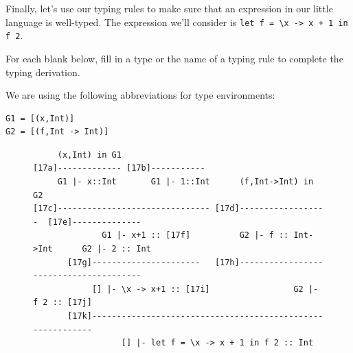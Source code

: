\documentclass[addpoints]{exam}
\begin{document}
\begin{questions}

\newpage

\question

Finally, let's use our typing rules to make sure that an expression in our little language is well-typed.  The expression we'll consider is \verb|let f = \x -> x + 1 in f 2|.

For each blank below, fill in a type or the name of a typing rule to complete the typing derivation.

We are using the following abbreviations for type environments:
\begin{verbatim}
G1 = [(x,Int)]
G2 = [(f,Int -> Int)]
\end{verbatim}

\begin{figure}[h]
\advance\leftskip-20cm
{\small
\begin{verbatim}
     (x,Int) in G1                                
[17a]------------- [17b]-----------
     G1 |- x::Int       G1 |- 1::Int      (f,Int->Int) in G2
[17c]------------------------------- [17d]------------------  [17e]--------------
              G1 |- x+1 :: [17f]          G2 |- f :: Int->Int      G2 |- 2 :: Int
       [17g]----------------------   [17h]---------------------------------------
            [] |- \x -> x+1 :: [17i]                 G2 |- f 2 :: [17j]
       [17k]-----------------------------------------------------------
                  [] |- let f = \x -> x + 1 in f 2 :: Int
\end{verbatim}
}
\end{figure}

\end{questions}
\end{document}
